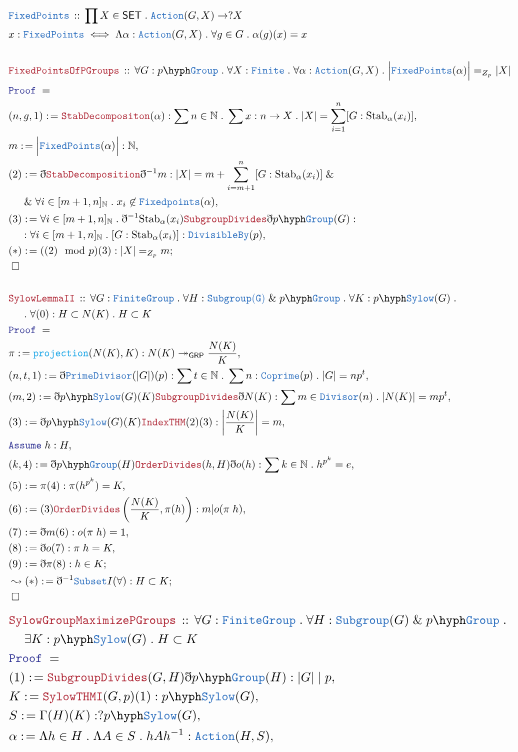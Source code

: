 \documentclass[12pt]{scrartcl}
\newcommand{\TYPE}[1]{\textcolor{NavyBlue}{\mathtt{#1}}}
\newcommand{\FUNC}[1]{\textcolor{Cerulean}{\mathtt{#1}}}
\newcommand{\LOGIC}[1]{\textcolor{Blue}{\mathtt{#1}}}
\newcommand{\THM}[1]{\textcolor{Maroon}{\mathtt{#1}}}
\renewcommand{\.}{\; . \;}
\newcommand{\de}{: \kern 0.1pc =}
\newcommand{\Theorem}[2]{& \THM{#1} \, :: \, #2 \\ & \Proof = \\ }
\newcommand{\DeclareType}[2]{& \TYPE{#1} \, :: \, #2 \\}
\newcommand{\DefineType}[3]{& #1 : \TYPE{#2} \iff #3 \\}
\newcommand{\NewLine}{\\ & \kern 1pc}
\newcommand{\Page}[1]{ \begin{align*} #1 \end{align*}   }
\newcommand{ \bd }{ \ByDef }
\renewcommand{\And}{\; \& \;}
\newcommand{\Nat}{\mathbb{N} }
\newcommand{\ToSurj}{\twoheadrightarrow}
\newcommand{\Say}[3]{& #1 \de #2 : #3, \\}
\newcommand{\Conclude}[3]{& #1 \de #2 : #3; \\}
\newcommand{\DeriveConclude}[3]{& \leadsto #1 \de #2 : #3 ; \\}
\newcommand{\Assume}[2]{& \LOGIC{Assume} \; #1 : #2, \\}
\newcommand{\QED}{\; \square}
\newcommand{\EndProof}{& \QED \\}
\newcommand{\ByDef}{\eth}
\newcommand{\Proof}{\LOGIC{Proof} \; }
\newcommand{\SET}{\mathsf{SET}}
\newcommand{\Group}{\TYPE{Group}}
\newcommand{\FG}{\TYPE{FiniteGroup}}
\newcommand{\Stab}{\mathrm{Stab}}
\newcommand{\GRP}{\mathsf{GRP}}
\begin{document}
\Page{
	\DeclareType{FixedPoints}{\prod X \in \SET \. \TYPE{Action}(G,X) \to ?X}
	\DefineType{x}{FixedPoints}{\Lambda \alpha : \TYPE{Action}(G,X) \. \forall  g \in G \. \alpha(g)(x) = x }
	\\
	\Theorem{FixedPointsOfPGroups}{\forall G : p\hyph\TYPE{Group} \. \forall X : \TYPE{Finite} \. 
		\forall \alpha : \TYPE{Action}(G,X) \.  \Big| \TYPE{FixedPoints}(\alpha) \Big| =_{Z_p} |X|       
	}
	\Say{(n,g,1)}{\THM{StabDecompositon}(\alpha)}{ \sum n \in \Nat \. \sum x : n \to X \. |X| = 
		\sum^n_{i=1} [G : \Stab_\alpha(x_i)] }
	\Say{m}{\Big| \TYPE{FixedPoints}(\alpha)\Big|}{\Nat}
	\Say{(2)}{\bd \THM{StabDecomposition}\bd^{-1} m }{ |X| = m + \sum^n_{i=m + 1} [G : \Stab_\alpha(x_i)]
	 \And \NewLine \And \forall i \in [m+1,n]_\Nat \. x_i \not \in \TYPE{Fixedpoints}(\alpha) 
	}
	\Say{(3)}{\forall i \in [m+1,n]_\Nat \.\bd^{-1} \Stab_\alpha(x_i) \THM{SubgroupDivides}\bd p\hyph\Group(G)}
	{ \NewLine : \forall i \in [m+1,n]_\Nat \. [G : \Stab_\alpha(x_i)] : \TYPE{DivisibleBy}(p) } 
	\Conclude{(*)}{( (2) \mod p )(3)}{  |X| =_{Z_p} m       }
	\EndProof
	\\
	\Theorem{SylowLemmaII}{\forall G : \FG \. \forall H : \TYPE{Subgroup(G)} \And p\hyph\Group
		\. \forall K : p\hyph\TYPE{Sylow}( G ) \.  \NewLine \. \forall (0) : H \subset N(K) \. H \subset K     
	}
	\Say{\pi}{\FUNC{projection}(N(K),K)}{ N(K) \ToSurj_{\GRP} \frac{N(K)}{K}}
	\Say{(n,t,1)}{\bd \TYPE{PrimeDivisor}(|G|)(p)}{ \sum t \in \Nat \. \sum n : \TYPE{Coprime}(p) \. |G| = np^t }
	\Say{(m,2)}{\bd p\hyph\TYPE{Sylow}(G)(K)\THM{SubgroupDivides}\bd N(K)}{\sum m \in \TYPE{Divisor}(n) \. |N(K)| = mp^t}
	\Say{(3)}{\bd p\hyph\TYPE{Sylow}(G)(K)\THM{IndexTHM}(2)(3) }{\left| \frac{N(K)}{K} \right| = m}
	\Assume{h}{H}
	\Say{(k,4)}{\bd p\hyph\Group(H)\THM{OrderDivides}(h,H)\bd o(h)}{\sum k \in \Nat \. h^{p^k} = e}
	\Say{(5)}{ \pi (4) }{ \pi(h^{p^k}) = K  }
	\Say{(6)}{(3)\THM{OrderDivides}\left( \frac{N(K)}{K},\pi(h)\right)}{ m | o(\pi \; h)   }
	\Say{(7)}{\bd m (6)}{ o(\pi \; h) = 1 }
	\Say{(8)}{\bd o (7)}{ \pi \; h = K }
	\Conclude{(9)}{\bd \pi (8)}{h \in K}
	\DeriveConclude{(*)}{\bd^{-1} \TYPE{Subset}I(\forall)}{H \subset K}
	\EndProof
}\Page{
	\Theorem{SylowGroupMaximizePGroups}{\forall G : \FG \. 
		\forall H : \TYPE{Subgroup}(G) \And p\hyph \Group \. 
		\NewLine 
		\exists K : p\hyph\TYPE{Sylow}(G) \. H \subset K 
	}
	\Say{(1)}{\THM{SubgroupDivides}(G,H) \bd p\hyph\TYPE{Group}(H)}{ |G|\; | \; p}
	\Say{K}{\THM{SylowTHMI}(G,p)(1)}{p\hyph \TYPE{Sylow}(G)}
	\Say{S}{\Gamma(H)(K)}{?p \hyph \TYPE{Sylow}(G)}
	\Say{\alpha}{\Lambda h \in H \. \Lambda A \in S \. hAh^{-1}}{ \TYPE{Action}(H,S)}
}
\end{document}
